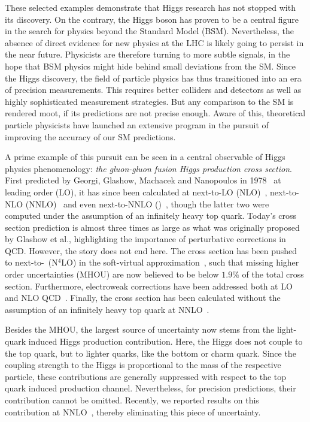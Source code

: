 These selected examples demonstrate that Higgs research has not stopped with its discovery. On the contrary, the Higgs boson has proven to be a central figure in the search for physics beyond the Standard Model (\acs{BSM}). Nevertheless, the absence of direct evidence for new physics at the LHC is likely going to persist in the near future. Physicists are therefore turning to more subtle signals, in the hope that \acs{BSM} physics might hide behind small deviations from the \acs{SM}. Since the Higgs discovery, the field of particle physics has thus transitioned into an era of precision measurements. This requires better colliders and detectors as well as highly sophisticated measurement strategies. But any comparison to the \acs{SM} is rendered moot, if its predictions are not precise enough. Aware of this, theoretical particle physicists have launched an extensive program in the pursuit of improving the accuracy of our \acs{SM} predictions.

A prime example of this pursuit can be seen in a central observable of Higgs physics phenomenology: \textit{the gluon-gluon fusion Higgs production cross section}. First predicted by Georgi, Glashow, Machacek and Nanopoulos in 1978~\cite{Georgi:1977gs} at leading order (\acs{LO}), it has since been calculated at next-to-\acs{LO} (\acs{NLO})~\cite{Dawson:1990zj,Djouadi:1991tka}, next-to-\acs{NLO} (\acs{NNLO})~\cite{Catani:2001ic, Harlander:2002wh,Anastasiou:2002yz} and even next-to-\acs{NNLO} (\NNNLO)~\cite{Anastasiou:2015vya,Mistlberger:2018etf}, though the latter two were computed under the assumption of an infinitely heavy top quark. Today's cross section prediction is almost three times as large as what was originally proposed by Glashow et al., highlighting the importance of perturbative corrections in \acs{QCD}. However, the story does not end here. The cross section has been pushed to next-to-\NNNLO\ (N${}^4$LO) in the soft-virtual approximation~\cite{Das:2020adl}, such that missing higher order uncertainties (\acs{MHOU}) are now believed to be below $1.9\%$ of the total cross section. Furthermore, electroweak corrections have been addressed both at \acs{LO}~\cite{Aglietti:2004nj,Degrassi:2004mx} and \acs{NLO} \acs{QCD}~\cite{Actis:2008ts, Actis:2008ug,Anastasiou:2008tj,Anastasiou:2018adr,Bonetti:2018ukf,Becchetti:2020wof}. Finally, the cross section has been calculated without the assumption of an infinitely heavy top quark at \acs{NNLO}~\cite{Czakon:2021yub}.

Besides the \acs{MHOU}, the largest source of uncertainty now stems from the light-quark induced Higgs production contribution. Here, the Higgs does not couple to the top quark, but to lighter quarks, like the bottom or charm quark. Since the coupling strength to the Higgs is proportional to the mass of the respective particle, these contributions are generally suppressed with respect to the top quark induced production channel. Nevertheless, for precision predictions, their contribution cannot be omitted. Recently, we reported results on this contribution at \acs{NNLO}~\cite{Czakon:2023kqm, Czakon:2024ywb}, thereby eliminating this piece of uncertainty.


